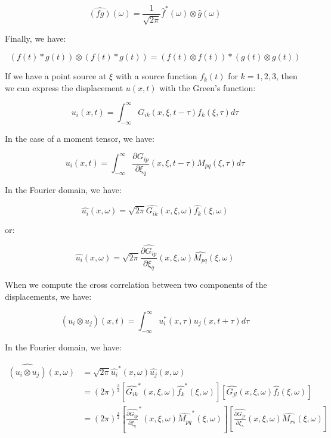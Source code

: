 \documentclass[workdone.tex]{subfiles}
\begin{document}
\begin{equation}
\hat{(f g)} (\omega) = \frac{1}{\sqrt{2 \pi}} \hat{f}^* (\omega) \otimes \hat{g} (\omega)
\end{equation}

Finally, we have:

\begin{equation}
(f(t) * g(t)) \otimes (f(t) * g(t)) = (f(t) \otimes f(t)) * (g(t) \otimes g(t))
\end{equation}

If we have a point source at $\xi$ with a source function $f_k (t)$ for $k = 1, 2, 3$, then we can express the displacement $u(x, t)$ with the Green's function:

\begin{equation}
u_i(x, t) = \int_{- \infty}^{\infty} G_{ik} (x, \xi, t - \tau) f_k (\xi, \tau) d\tau
\end{equation}

In the case of a moment tensor, we have:

\begin{equation}
u_i(x, t) = \int_{- \infty}^{\infty} \frac{\partial G_{ip} }{\partial \xi_q} (x, \xi, t - \tau) M_{pq} (\xi, \tau) d\tau
\end{equation}

In the Fourier domain, we have:

\begin{equation}
\hat{u_i} (x, \omega) = \sqrt{2 \pi} \hat{G_{ik}} (x, \xi, \omega) \hat{f_k} (\xi, \omega)
\end{equation}

or:

\begin{equation}
\hat{u_i} (x, \omega) = \sqrt{2 \pi} \hat{\frac{\partial G_{ip}}{\partial \xi_q} } (x, \xi, \omega) \hat{M_{pq}} (\xi, \omega)
\end{equation}

When we compute the cross correlation between two components of the displacements, we have:

\begin{equation}
(u_i \otimes u_j) (x, t) = \int_{- \infty}^{\infty} u_i^* (x, \tau) u_j (x, t + \tau) d\tau
\end{equation}

In the Fourier domain, we have:

\begin{equation}
\begin{split}
\hat{(u_i \otimes u_j)} (x, \omega) & = \sqrt{2 \pi} \hat{u_i}^* (x, \omega) \hat{u_j} (x, \omega) \\
                                        & = (2 \pi)^{\frac{3}{2}} [\hat{G_{ik}}^* (x, \xi, \omega) \hat{f_k}^* (\xi, \omega)] [\hat{G_{jl}} (x, \xi, \omega) \hat{f_l} (\xi, \omega)] \\
                                        & = (2 \pi)^{\frac{3}{2}} [\hat{\frac{\partial G_{ip}}{\partial \xi_q}}^* (x, \xi, \omega) \hat{M_{pq}}^* (\xi, \omega)] [\hat{\frac{\partial G_{jr}}{\partial \xi_s}} (x, \xi, \omega) \hat{M_{rs}} (\xi, \omega)] 
\end{split}
\end{equation}
\end{document}
